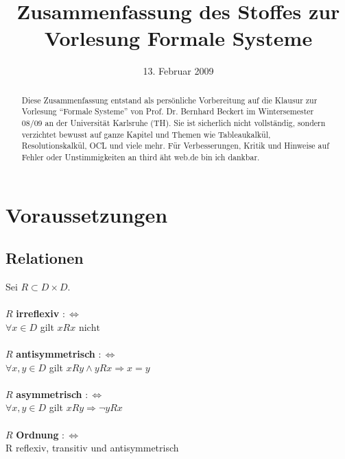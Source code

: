 \documentclass[a4paper,11pt]{scrartcl}
\title{Zusammenfassung des Stoffes zur Vorlesung Formale Systeme}
\date{13. Februar 2009}
\newcommand{\tbf}{\textbf}
\newcommand{\Lra}{\Leftrightarrow}
\theoremstyle{default}
\begin{document}
\maketitle

\begin{abstract}
Diese Zusammenfassung entstand als persönliche Vorbereitung auf die Klausur zur Vorlesung ``Formale Systeme'' von Prof. Dr. Bernhard Beckert im Wintersemester 08/09 an der Universität Karlsruhe (TH). Sie ist sicherlich nicht vollständig, sondern verzichtet bewusst auf ganze Kapitel und Themen wie Tableaukalkül, Resolutionskalkül, OCL und viele mehr. Für Verbesserungen, Kritik und Hinweise auf Fehler oder Unstimmigkeiten an third äht web.de bin ich dankbar.
\end{abstract}

\setcounter{tocdepth}{1}
\tableofcontents

\newpage
\section{Voraussetzungen}
\subsection{Relationen}
Sei $R \subset D \times D$. \\
\ \\ $R$ \tbf{irreflexiv} $:\Lra$ \\
$\forall x \in D$ gilt $xRx \text{ nicht}$ \\
\ \\ $R$ \tbf{antisymmetrisch} $:\Lra$ \\
$\forall x,y \in D$ gilt $xRy \land yRx \Rightarrow x = y$ \\
\ \\ $R$ \tbf{asymmetrisch} $:\Lra$ \\
$\forall x,y \in D$ gilt $xRy \Rightarrow \neg yRx$ \\
\ \\ $R$ \tbf{Ordnung} $:\Lra$ \\
R reflexiv, transitiv und antisymmetrisch \\
\ \\ $R$ \tbf{strikte Ordnung} $:\Lra$ \\
R irreflexiv, transitiv und asymmetrisch \\
\ \\ $R$ \tbf{totale Ordnung} $:\Lra$ \\
R Ordnung und $\forall x,y \in D$ mit $x \not = y$ gilt entweder $xRy$ oder $yRx$ \\
\ \\ $R$ \tbf{Kongruenzrelation} bzgl. $\Sigma$ $:\Lra$ \\
R Äquivalenzrelation und $\forall f \in \Sigma$ mit Stelligkeit $n$ und $\forall x_1, ..., x_n, y_1, ..., y_n \in D$ gilt $x_{1}Ry_{1}, ..., x_{n}Ry_{n} \Rightarrow f(x_1, ..., x_n)Rf(y_1, ..., y_n)$ \\
\end{document}
